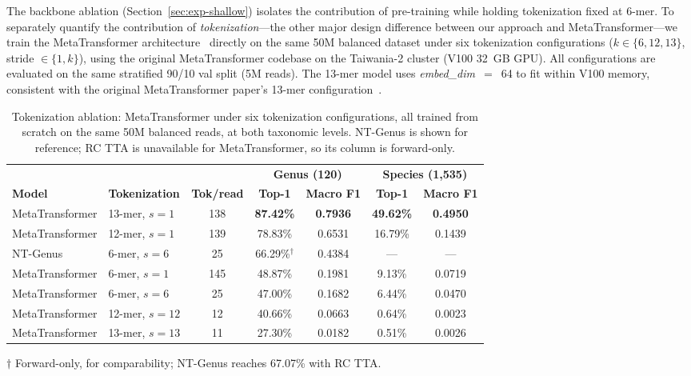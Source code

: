 The backbone ablation (Section~\ref{sec:exp-shallow}) isolates the contribution of pre-training while holding tokenization fixed at 6-mer. To separately quantify the contribution of \emph{tokenization}---the other major design difference between our approach and MetaTransformer---we train the MetaTransformer architecture~\cite{Wichmann2023} directly on the same 50M balanced dataset under six tokenization configurations ($k \in \{6, 12, 13\}$, stride $\in \{1, k\}$), using the original MetaTransformer codebase on the Taiwania-2 cluster (V100 32~GB GPU). All configurations are evaluated on the same stratified 90/10 val split (5M reads). The 13-mer model uses \textit{embed\_dim}~$=$~64 to fit within V100 memory, consistent with the original MetaTransformer paper's 13-mer configuration~\cite{Wichmann2023}.

\begin{table}[htbp]
    \centering
    \caption{Tokenization ablation: MetaTransformer under six tokenization configurations, all trained from scratch on the same 50M balanced reads, at both taxonomic levels. NT-Genus is shown for reference; RC TTA is unavailable for MetaTransformer, so its column is forward-only.}
    \label{tab:tokenization-ablation}
    \small
    \begin{tabular}{llccccc}
        \toprule
        & & & \multicolumn{2}{c}{\textbf{Genus (120)}} & \multicolumn{2}{c}{\textbf{Species (1,535)}} \\
        \cmidrule(lr){4-5}\cmidrule(lr){6-7}
        \textbf{Model} & \textbf{Tokenization} & \textbf{Tok/read} & \textbf{Top-1} & \textbf{Macro F1} & \textbf{Top-1} & \textbf{Macro F1} \\
        \midrule
        MetaTransformer & 13-mer, $s{=}1$  & 138 & \textbf{87.42\%} & \textbf{0.7936} & \textbf{49.62\%} & \textbf{0.4950} \\
        MetaTransformer & 12-mer, $s{=}1$  & 139 & 78.83\% & 0.6531 & 16.79\% & 0.1439 \\
        NT-Genus        & 6-mer, $s{=}6$   & 25  & 66.29\%$^\dagger$ & 0.4384 & --- & --- \\
        MetaTransformer & 6-mer, $s{=}1$   & 145 & 48.87\% & 0.1981 & 9.13\%  & 0.0719 \\
        MetaTransformer & 6-mer, $s{=}6$   & 25  & 47.00\% & 0.1682 & 6.44\%  & 0.0470 \\
        MetaTransformer & 12-mer, $s{=}12$ & 12  & 40.66\% & 0.0663 & 0.64\%  & 0.0023 \\
        MetaTransformer & 13-mer, $s{=}13$ & 11  & 27.30\% & 0.0182 & 0.51\%  & 0.0026 \\
        \bottomrule
    \end{tabular}
    \begin{tablenotes}
        \small
        \item $\dagger$ Forward-only, for comparability; NT-Genus reaches 67.07\% with RC TTA.
    \end{tablenotes}
\end{table}

